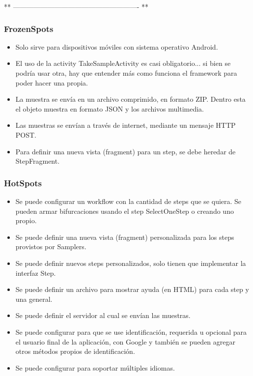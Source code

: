 ** ------------------------------------------------------- **

\subsubsection{FrozenSpots}

\begin{itemize}
	\item Solo sirve para dispositivos móviles con sistema operativo Android.
	\item El uso de la activity TakeSampleActivity es casi obligatorio... si bien se podría usar otra, hay que entender más como funciona el framework para poder hacer una propia.
	\item La muestra se envía en un archivo comprimido, en formato ZIP. Dentro esta el objeto muestra en formato JSON y los archivos multimedia.
	\item Las muestras se envían a través de internet, mediante un mensaje HTTP POST.
	\item Para definir una nueva vista (fragment) para un step, se debe heredar de StepFragment.
\end{itemize}

\subsubsection{HotSpots}

\begin{itemize}
	\item Se puede configurar un workflow con la cantidad de steps que se quiera. Se pueden armar bifurcaciones usando el step SelectOneStep o creando uno propio.
	\item Se puede definir una nueva vista (fragment) personalizada para los steps provistos por Samplers.
	\item Se puede definir nuevos steps personalizados, solo tienen que implementar la interfaz Step.
	\item Se puede definir un archivo para mostrar ayuda (en HTML) para cada step y una general.
	\item Se puede definir el servidor al cual se envían las muestras.
	\item Se puede configurar para que se use identificación, requerida u opcional para el usuario final de la aplicación, con Google y también se pueden agregar otros métodos propios de identificación.
	\item Se puede configurar para soportar múltiples idiomas.
\end{itemize}






